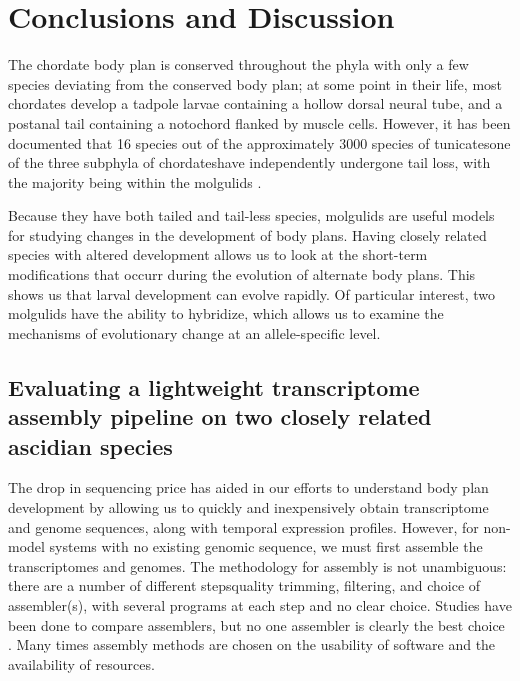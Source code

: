 \chapter{Conclusions and Discussion}

The chordate body plan is conserved throughout the phyla with only a few species deviating from the conserved body plan; at some point in their life, most chordates develop a tadpole larvae containing a hollow dorsal neural tube, and a postanal tail containing a notochord flanked by muscle cells. However, it has been documented that 16 species out of the approximately 3000 species of tunicates\textemdash one of the three subphyla of chordates\textemdash have independently undergone tail loss, with the majority being within the molgulids \cite{berrill_studies_1931,huber_evolution_2000}. %

Because they have both tailed and tail-less species, molgulids are useful models for studying changes in the development of body plans. Having closely related species with altered development allows us to look at the short-term modifications that occurr during the evolution of alternate body plans. This shows us that larval development can evolve rapidly. Of particular interest, two molgulids have the ability to hybridize, which allows us to examine the mechanisms of evolutionary change at an allele-specific level.

\section{Evaluating a lightweight transcriptome assembly pipeline on two closely related ascidian species}
The drop in sequencing price has aided in our efforts to understand body plan development by allowing us to quickly and inexpensively obtain transcriptome and genome sequences, along with temporal expression profiles. %
However, for non-model systems with no existing genomic sequence, we must first assemble the transcriptomes and genomes.  The methodology for assembly is not unambiguous: there are a number of different steps\textemdash quality trimming, filtering, and choice of assembler(s), with several programs at each step and no clear choice. Studies have been done to compare assemblers, but no one assembler is clearly the best choice \cite{clarke_comparative_2013}. Many times assembly methods are chosen on the usability of software and the availability of resources.

